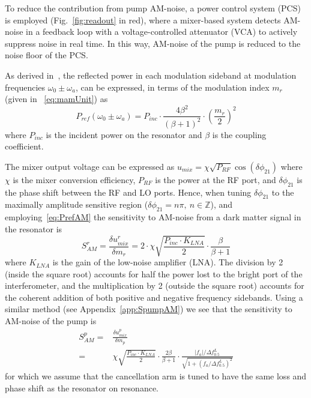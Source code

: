 \documentclass[
  aps,
  physrev,
  reprint,
  superscriptaddress,
  nofootinbib,
  amsmath,
  amssymb
]{revtex4-2}
\begin{document}
To reduce the contribution from pump AM-noise, a power control system (PCS) is employed (Fig.~\ref{fig:readout} in red), where a mixer-based system detects AM-noise in a feedback loop with a voltage-controlled attenuator (VCA) to actively suppress noise in real time. In this way, AM-noise of the pump is reduced to the noise floor of the PCS.

As derived in~\cite{Bourhill2023}, the reflected power in each modulation sideband at modulation frequencies $\omega_0 \pm \omega_a$, can be expressed, in terms of the modulation index $m_r$ (given in ~\eqref{eq:mamUnit}) as
\begin{equation} \label{eq:PrefAM}
    P_{ref}(\omega_0 \pm \omega_a) = P_{inc}\cdot\frac{4 \beta^2}{(\beta+1)^{2}}\cdot (\frac{m_r}{2})^2
\end{equation}
where $P_{inc}$ is the incident power on the resonator and $\beta$ is the coupling coefficient.

The mixer output voltage can be expressed as $u_{mix} = \chi \sqrt{P_{RF}}\cos(\delta\phi_{21})$ where $\chi$ is the mixer conversion efficiency, $P_{RF}$ is the power at the RF port, and $\delta\phi_{21}$ is the phase shift between the RF and LO ports. Hence, when tuning $\delta \phi_{21}$ to the maximally amplitude sensitive region ($\delta\phi_{21} = n\pi,~n\in \mathbb{Z}$), and employing~\eqref{eq:PrefAM} the sensitivity to AM-noise from a dark matter signal in the resonator is
\begin{equation} \label{eq:Sres}
    S_{AM}^r = \frac{\delta u_{mix}^r}{\delta m_r} = 2\cdot\chi \sqrt{\frac{P_{inc}\cdot K_{LNA}}{2}}\cdot\frac{\beta}{\beta+1}
\end{equation}
where $K_{LNA}$ is the gain of the low-noise amplifier (LNA). The division by 2 (inside the square root) accounts for half the power lost to the bright port of the interferometer, and the multiplication by 2 (outside the square root) accounts for the coherent addition of both positive and negative frequency sidebands. Using a similar method (see Appendix~\ref{app:SpumpAM}) we see that the sensitivity to AM-noise of the pump is
\begin{equation} \label{eq:Spump}
    \begin{aligned}
    S_{AM}^p =& \frac{\delta u_{mix}^p}{\delta m_p} \\
    =& \chi\sqrt{\frac{P_{inc} \cdot K_{LNA}}{2}}\cdot\frac{2\beta}{\beta+1}\cdot\frac{|f_a|/\Delta f_{0.5}^L}{\sqrt{1 + (f_a/\Delta f_{0.5}^L)^2}}
    \end{aligned}
\end{equation}
for which we assume that the cancellation arm is tuned to have the same loss and phase shift as the resonator on resonance.
\end{document}
